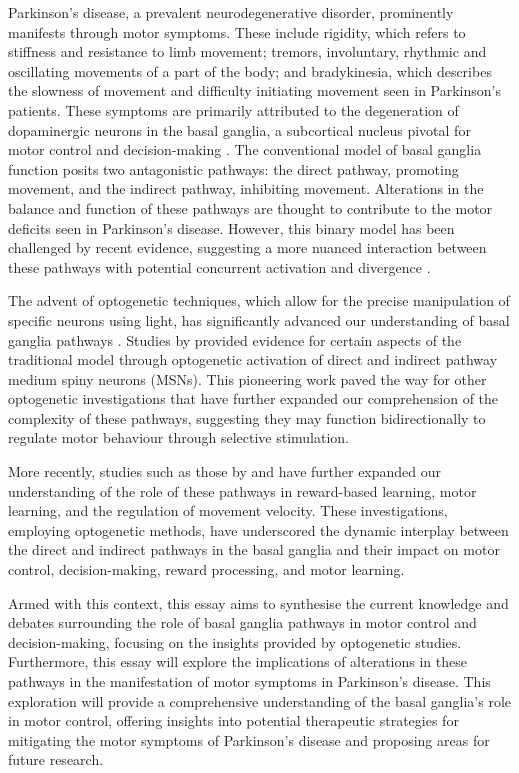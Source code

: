 \documentclass[10pt]{article}
\begin{document}
\begin{sloppypar}
  Parkinson’s disease, a prevalent neurodegenerative disorder, prominently manifests through motor symptoms. These include rigidity, which refers to stiffness and resistance to limb movement; tremors, involuntary, rhythmic and oscillating movements of a part of the body; and bradykinesia, which describes the slowness of movement and difficulty initiating movement seen in Parkinson’s patients. These symptoms are primarily attributed to the degeneration of dopaminergic neurons in the basal ganglia, a subcortical nucleus pivotal for motor control and decision-making \citep{kravitz_regulation_2010}. The conventional model of basal ganglia function posits two antagonistic pathways: the direct pathway, promoting movement, and the indirect pathway, inhibiting movement. Alterations in the balance and function of these pathways are thought to contribute to the motor deficits seen in Parkinson’s disease. However, this binary model has been challenged by recent evidence, suggesting a more nuanced interaction between these pathways with potential concurrent activation and divergence \citep{dunovan_believer-skeptic_2016}.

  The advent of optogenetic techniques, which allow for the precise manipulation of specific neurons using light, has significantly advanced our understanding of basal ganglia pathways \citep{kravitz_regulation_2010, cui_concurrent_2013}. Studies by \cite{kravitz_regulation_2010} provided evidence for certain aspects of the traditional model through optogenetic activation of direct and indirect pathway medium spiny neurons (MSNs). This pioneering work paved the way for other optogenetic investigations that have further expanded our comprehension of the complexity of these pathways, suggesting they may function bidirectionally \citep{yttri_opponent_2016} to regulate motor behaviour through selective stimulation.

  More recently, studies such as those by \cite{hilt_evidence_2016} and \cite{wang_direct_2015} have further expanded our understanding of the role of these pathways in reward-based learning, motor learning, and the regulation of movement velocity. These investigations, employing optogenetic methods, have underscored the dynamic interplay between the direct and indirect pathways in the basal ganglia and their impact on motor control, decision-making, reward processing, and motor learning.

  Armed with this context, this essay aims to synthesise the current knowledge and debates surrounding the role of basal ganglia pathways in motor control and decision-making, focusing on the insights provided by optogenetic studies. Furthermore, this essay will explore the implications of alterations in these pathways in the manifestation of motor symptoms in Parkinson’s disease. This exploration will provide a comprehensive understanding of the basal ganglia’s role in motor control, offering insights into potential therapeutic strategies for mitigating the motor symptoms of Parkinson’s disease and proposing areas for future research.


\end{sloppypar}
\end{document}

